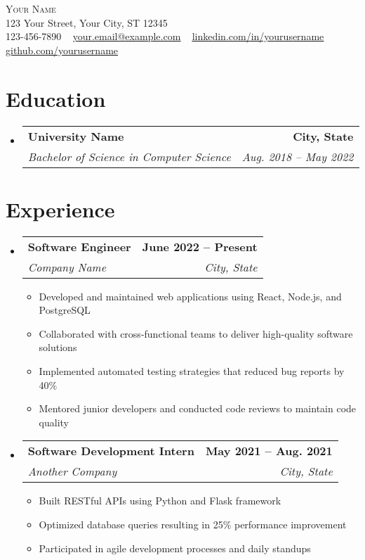 \documentclass[letterpaper,11pt]{article}
\makeatletter
\newcommand{\resumeItem}[1]{
  \item\small{
    {#1 \vspace{-2pt}}
  }
}
\newcommand{\resumeSubheading}[4]{
  \vspace{-2pt}\item
    \begin{tabular*}{1.0\textwidth}[t]{l@{\extracolsep{\fill}}r}
      \textbf{#1} & \textbf{\small #2} \\
      \textit{\small#3} & \textit{\small #4} \\
    \end{tabular*}\vspace{-7pt}
}
\newcommand{\resumeSubHeadingListStart}{\begin{itemize}[leftmargin=0.0in, label={}]}
\newcommand{\resumeSubHeadingListEnd}{\end{itemize}}
\newcommand{\resumeItemListStart}{\begin{itemize}}
\newcommand{\resumeItemListEnd}{\end{itemize}\vspace{-5pt}}
\makeatother
\begin{document}
\begin{center}
    {\Huge \scshape Your Name} \\ \vspace{1pt}
    123 Your Street, Your City, ST 12345 \\ \vspace{1pt}
    \small 123-456-7890 ~ \href{mailto:your.email@example.com}{\underline{your.email@example.com}} ~ 
    \href{https://linkedin.com/in/yourusername}{\underline{linkedin.com/in/yourusername}}  ~
    \href{https://github.com/yourusername}{\underline{github.com/yourusername}}
    \vspace{-8pt}
\end{center}

\section{Education}
  \resumeSubHeadingListStart
    \resumeSubheading
      {University Name}{City, State}
      {Bachelor of Science in Computer Science}{Aug. 2018 -- May 2022}
  \resumeSubHeadingListEnd

\section{Experience}
  \resumeSubHeadingListStart

    \resumeSubheading
      {Software Engineer}{June 2022 -- Present}
      {Company Name}{City, State}
      \resumeItemListStart
        \resumeItem{Developed and maintained web applications using React, Node.js, and PostgreSQL}
        \resumeItem{Collaborated with cross-functional teams to deliver high-quality software solutions}
        \resumeItem{Implemented automated testing strategies that reduced bug reports by 40\%}
        \resumeItem{Mentored junior developers and conducted code reviews to maintain code quality}
      \resumeItemListEnd

    \resumeSubheading
      {Software Development Intern}{May 2021 -- Aug. 2021}
      {Another Company}{City, State}
      \resumeItemListStart
        \resumeItem{Built RESTful APIs using Python and Flask framework}
        \resumeItem{Optimized database queries resulting in 25\% performance improvement}
        \resumeItem{Participated in agile development processes and daily standups}
    \resumeItemListEnd

  \resumeSubHeadingListEnd
\vspace{-16pt}
\end{document}
